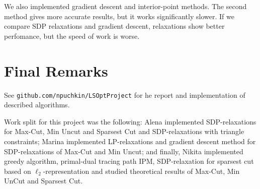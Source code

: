 \documentclass[12pt]{article}
\begin{document}
We also implemented gradient descent and interior-point methods.
The second method gives more accurate results, but it works significantly slower.
If we compare SDP relaxations and gradient descent, relaxations show better 
perfomance, but the speed of work is worse.


\section*{Final Remarks}

See \verb'github.com/npuchkin/LSOptProject' for he report and implementation of 
described algorithms.

Work split for this project was the following: Alena implemented SDP-relaxations for 
Max-Cut, Min Uncut and Sparsest Cut and SDP-relaxations with triangle constraints;
Marina implemented LP-relaxations and gradient descent method for SDP-relaxations of 
Max-Cut and Min Uncut;
and finally, Nikita implemented greedy algorithm, primal-dual tracing path IPM, 
SDP-relaxation for sparsest cut	based on $\ell_2$-representation and studied 
theoretical results of Max-Cut, Min UnCut and Sparsest Cut.
\end{document}
